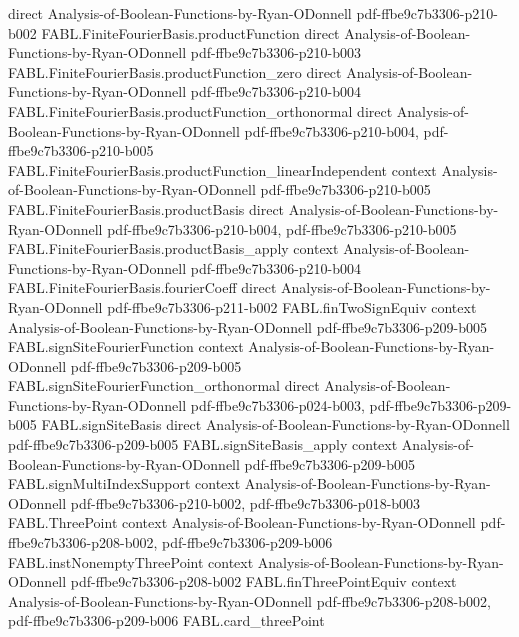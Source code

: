 \begin{theorem}
  {direct}
  {Analysis-of-Boolean-Functions-by-Ryan-ODonnell}
  {pdf-ffbe9c7b3306-p210-b002}
\proofstep
  {FABL.FiniteFourierBasis.productFunction}
  {direct}
  {Analysis-of-Boolean-Functions-by-Ryan-ODonnell}
  {pdf-ffbe9c7b3306-p210-b003}
\proofstep
  {FABL.FiniteFourierBasis.productFunction_zero}
  {direct}
  {Analysis-of-Boolean-Functions-by-Ryan-ODonnell}
  {pdf-ffbe9c7b3306-p210-b004}
\proofstep
  {FABL.FiniteFourierBasis.productFunction_orthonormal}
  {direct}
  {Analysis-of-Boolean-Functions-by-Ryan-ODonnell}
  {pdf-ffbe9c7b3306-p210-b004,
    pdf-ffbe9c7b3306-p210-b005}
\proofstep
  {FABL.FiniteFourierBasis.productFunction_linearIndependent}
  {context}
  {Analysis-of-Boolean-Functions-by-Ryan-ODonnell}
  {pdf-ffbe9c7b3306-p210-b005}
\proofstep
  {FABL.FiniteFourierBasis.productBasis}
  {direct}
  {Analysis-of-Boolean-Functions-by-Ryan-ODonnell}
  {pdf-ffbe9c7b3306-p210-b004,
    pdf-ffbe9c7b3306-p210-b005}
\proofstep
  {FABL.FiniteFourierBasis.productBasis_apply}
  {context}
  {Analysis-of-Boolean-Functions-by-Ryan-ODonnell}
  {pdf-ffbe9c7b3306-p210-b004}
\proofstep
  {FABL.FiniteFourierBasis.fourierCoeff}
  {direct}
  {Analysis-of-Boolean-Functions-by-Ryan-ODonnell}
  {pdf-ffbe9c7b3306-p211-b002}
\proofstep
  {FABL.finTwoSignEquiv}
  {context}
  {Analysis-of-Boolean-Functions-by-Ryan-ODonnell}
  {pdf-ffbe9c7b3306-p209-b005}
\proofstep
  {FABL.signSiteFourierFunction}
  {context}
  {Analysis-of-Boolean-Functions-by-Ryan-ODonnell}
  {pdf-ffbe9c7b3306-p209-b005}
\proofstep
  {FABL.signSiteFourierFunction_orthonormal}
  {direct}
  {Analysis-of-Boolean-Functions-by-Ryan-ODonnell}
  {pdf-ffbe9c7b3306-p024-b003,
    pdf-ffbe9c7b3306-p209-b005}
\proofstep
  {FABL.signSiteBasis}
  {direct}
  {Analysis-of-Boolean-Functions-by-Ryan-ODonnell}
  {pdf-ffbe9c7b3306-p209-b005}
\proofstep
  {FABL.signSiteBasis_apply}
  {context}
  {Analysis-of-Boolean-Functions-by-Ryan-ODonnell}
  {pdf-ffbe9c7b3306-p209-b005}
\proofstep
  {FABL.signMultiIndexSupport}
  {context}
  {Analysis-of-Boolean-Functions-by-Ryan-ODonnell}
  {pdf-ffbe9c7b3306-p210-b002,
    pdf-ffbe9c7b3306-p018-b003}
\proofstep
  {FABL.ThreePoint}
  {context}
  {Analysis-of-Boolean-Functions-by-Ryan-ODonnell}
  {pdf-ffbe9c7b3306-p208-b002,
    pdf-ffbe9c7b3306-p209-b006}
\proofstep
  {FABL.instNonemptyThreePoint}
  {context}
  {Analysis-of-Boolean-Functions-by-Ryan-ODonnell}
  {pdf-ffbe9c7b3306-p208-b002}
\proofstep
  {FABL.finThreePointEquiv}
  {context}
  {Analysis-of-Boolean-Functions-by-Ryan-ODonnell}
  {pdf-ffbe9c7b3306-p208-b002,
    pdf-ffbe9c7b3306-p209-b006}
\proofstep
  {FABL.card_threePoint}

\end{theorem}
